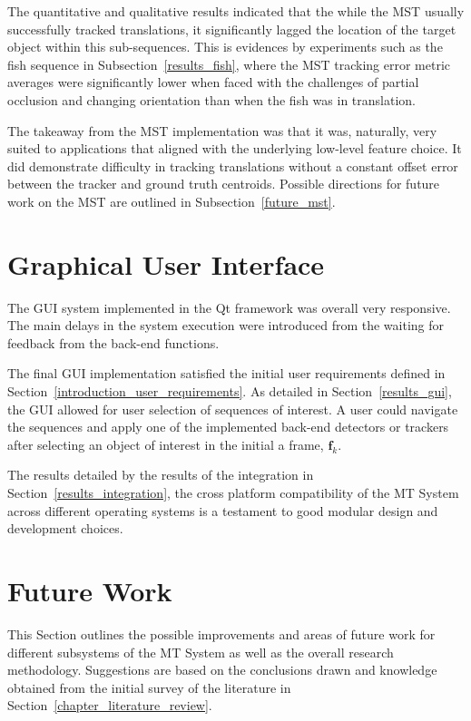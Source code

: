 The quantitative and qualitative results indicated that the while the MST
usually successfully tracked translations, it significantly
lagged the location of the target object within this sub-sequences. This is
evidences by experiments such as the fish sequence in
Subsection~\ref{results_fish}, where the MST tracking error metric averages
were significantly lower when faced with the challenges of partial occlusion and
changing orientation than when the fish was in translation.

The takeaway from the MST implementation was that it was, naturally, very suited to
applications that aligned with the underlying low-level feature choice. It did
demonstrate difficulty in tracking translations without a constant offset error between the
tracker and ground truth centroids. Possible directions for future work on the
MST are outlined in Subsection~\ref{future_mst}.

\section{Graphical User Interface}
The GUI system implemented in the Qt framework was overall very responsive. The
main delays in the system execution were introduced from the waiting for
feedback from the back-end functions.

The final GUI implementation satisfied the initial user requirements defined in
Section~\ref{introduction_user_requirements}. As detailed in
Section~\ref{results_gui}, the GUI allowed for user selection of sequences of
interest. A user could navigate the sequences and apply one of the implemented
back-end detectors or trackers after selecting an object of interest in the
initial a frame, $\mathbf{f}_k$.

The results detailed by the results of the integration in
Section~\ref{results_integration}, the cross platform compatibility of the MT
System across different operating systems is a testament to good modular design
and development choices.

\section{Future Work}\label{future}
This Section outlines the possible improvements and areas
of future work for different subsystems of the MT System as well as the overall
research methodology. Suggestions are based
on the conclusions drawn and knowledge obtained from the initial survey of the
literature in Section~\ref{chapter_literature_review}.

